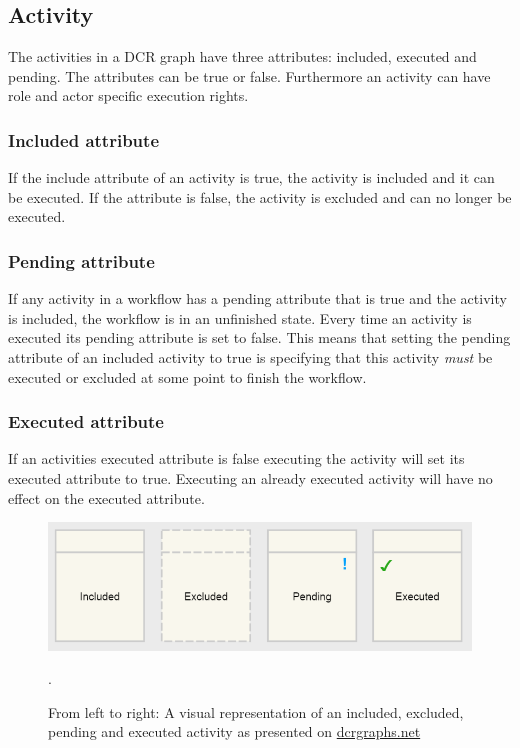 \documentclass{article}
\begin{document}
	\subsection{Activity}
	The activities in a DCR graph have three attributes: included, executed and pending. 
	The attributes can be true or false. 
	Furthermore an activity can have role and actor specific execution rights.

	\subsubsection{Included attribute}
	If the include attribute of an activity is true, the activity is included and it can be executed. 
	If the attribute is false, the activity is excluded and can no longer be executed.

	\subsubsection{Pending attribute}
	If any activity in a workflow has a pending attribute that is true and the activity is included, the workflow is in an unfinished state. 
	Every time an activity is executed its pending attribute is set to false.
	This means that setting the pending attribute of an included activity to true is specifying that this activity \emph{must} be executed or excluded at some point to finish the workflow.

	\subsubsection{Executed attribute}
	If an activities executed attribute is false executing the activity will set its executed attribute to true.
	Executing an already executed activity will have no effect on the executed attribute.

	\begin{figure}[h]
		\centering
		\includegraphics[width=1\textwidth]{figures/activity_states.png}
	 	\caption[Activity States]
	 	{From left to right: A visual representation of an included, excluded, pending and executed activity as presented on \href{http://www.dcrgraphs.net}{dcrgraphs.net}}.
	\end{figure}
\end{document}
